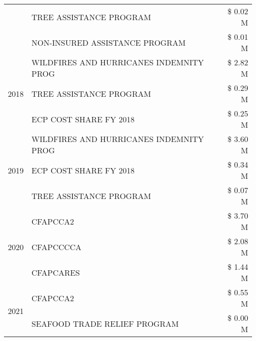 \begin{tabular}{llr}
 & TREE ASSISTANCE PROGRAM & \$ 0.02 M \\
 & NON-INSURED ASSISTANCE PROGRAM & \$ 0.01 M \\
\cline{1-3}
\multirow[t]{3}{*}{2018} & WILDFIRES AND HURRICANES INDEMNITY PROG & \$ 2.82 M \\
 & TREE ASSISTANCE PROGRAM & \$ 0.29 M \\
 & ECP COST SHARE FY 2018 & \$ 0.25 M \\
\cline{1-3}
\multirow[t]{3}{*}{2019} & WILDFIRES AND HURRICANES INDEMNITY PROG & \$ 3.60 M \\
 & ECP COST SHARE FY 2018 & \$ 0.34 M \\
 & TREE ASSISTANCE PROGRAM & \$ 0.07 M \\
\cline{1-3}
\multirow[t]{3}{*}{2020} & CFAPCCA2 & \$ 3.70 M \\
 & CFAPCCCCA & \$ 2.08 M \\
 & CFAPCARES & \$ 1.44 M \\
\cline{1-3}
\multirow[t]{2}{*}{2021} & CFAPCCA2 & \$ 0.55 M \\
 & SEAFOOD TRADE RELIEF PROGRAM & \$ 0.00 M \\
\cline{1-3}
\bottomrule
\end{tabular}
